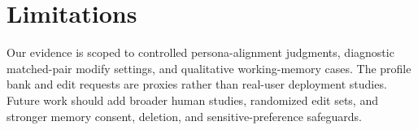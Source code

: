 \section{Limitations}

Our evidence is scoped to controlled persona-alignment judgments, diagnostic
matched-pair modify settings, and qualitative working-memory cases. The profile
bank and edit requests are proxies rather than real-user deployment studies.
Future work should add broader human studies, randomized edit sets, and stronger
memory consent, deletion, and sensitive-preference safeguards.
